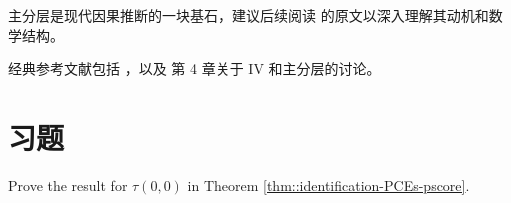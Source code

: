 主分层是现代因果推断的一块基石，建议后续阅读 \cite{RosenbaumRubin:1983b} 的原文以深入理解其动机和数学结构。

\begin{Remark}
经典参考文献包括 \cite{RosenbaumRubin:1983b}，以及 \cite{AngristPischke:2009} 第 4 章关于 IV 和主分层的讨论。
\end{Remark}

\section{习题}\label{sec:26-homework}

\begin{HomeworkProblem}\label{exr:26-1}

Prove the result for $\tau(0,0) $ in Theorem \ref{thm::identification-PCEs-pscore}.



\end{HomeworkProblem}

